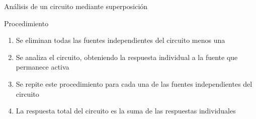 \documentclass[aspectratio=169, usenames,svgnames,dvipsnames]{beamer}
\begin{document}
\begin{frame}{Análisis de un circuito mediante superposición}
    \begin{block}{Procedimiento}
    \vspace{1mm}
    
    \begin{enumerate}
        \item Se \alert{eliminan} todas las \alert{fuentes independientes} del circuito menos una
        \vspace{1mm}
        
        \vspace{2mm}
        
        \item Se analiza el circuito, obteniendo la \alert{respuesta individual} a la fuente que permanece activa
        \vspace{2mm}
        
        \item Se repite este procedimiento para \alert{cada una de las fuentes independientes} del circuito
        \vspace{2mm}
        
        \item La respuesta total del circuito es la \alert{suma de las respuestas individuales}
    \end{enumerate}
    \vspace{1mm}
    \end{block}
\end{frame}

\end{document}

